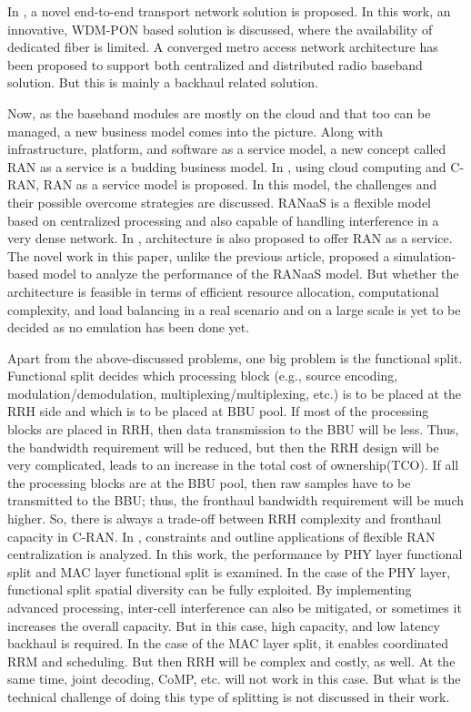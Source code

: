 \begin{multicols}{2}
In \cite{art3-key15}, a novel end-to-end transport network solution is proposed. In this work, an innovative, WDM-PON based solution is discussed, where the availability of dedicated fiber is limited. A converged metro access network architecture has been proposed to support both centralized and distributed radio baseband solution. But this is mainly a backhaul related solution.

Now, as the baseband modules are mostly on the cloud and that too can be managed, a new business model comes into the picture. Along with infrastructure, platform, and software as a service model, a new concept called RAN as a service is a budding business model. In \cite{art3-key16}, using cloud computing and C-RAN, RAN as a service model is proposed. In this model, the challenges and their possible overcome strategies are discussed. RANaaS is a flexible model based on centralized processing and also capable of handling interference in a very dense network. In \cite{art3-key17}, architecture is also proposed to offer RAN as a service. The novel work in this paper, unlike the previous article, proposed a simulation-based model to analyze the performance of the RANaaS model. But whether the architecture is feasible in terms of efficient resource allocation, computational complexity, and load balancing in a real scenario and on a large scale is yet to be decided as no emulation has been done yet.

Apart from the above-discussed problems, one big problem is the functional split. Functional split decides which processing block (e.g., source encoding, modulation/demodulation, multiplexing/multiplexing, etc.) is to be placed at the RRH side and which is to be placed at BBU pool. If most of the processing blocks are placed in RRH, then data transmission to the BBU will be less. Thus, the bandwidth requirement will be reduced, but then the RRH design will be very complicated, leads to an increase in the total cost of ownership(TCO). If all the processing blocks are at the BBU pool, then raw samples have to be transmitted to the BBU; thus, the fronthaul bandwidth requirement will be much higher. So, there is always a trade-off between RRH complexity and fronthaul capacity in C-RAN. In \cite{art3-key18}, constraints and outline applications of flexible RAN centralization is analyzed. In this work, the performance by PHY layer functional split and MAC layer functional split is examined. In the case of the PHY layer, functional split spatial diversity can be fully exploited. By implementing advanced processing, inter-cell interference can also be mitigated, or sometimes it increases the overall capacity. But in this case, high capacity, and low latency backhaul is required. In the case of the MAC layer split, it enables coordinated RRM and scheduling. But then RRH will be complex and costly, as well. At the same time, joint decoding, CoMP, etc. will not work in this case. But what is the technical challenge of doing this type of splitting is not discussed in their work.


\end{multicols}
